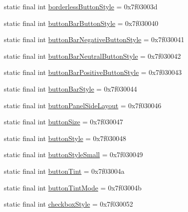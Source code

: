 \begin{DoxyCompactItemize}
\item 
static final int \mbox{\hyperlink{classcom_1_1google_1_1android_1_1gms_1_1R_1_1attr_a0ef109c40ff21ee8e450649d8db526da}{borderless\+Button\+Style}} = 0x7f03003d
\item 
static final int \mbox{\hyperlink{classcom_1_1google_1_1android_1_1gms_1_1R_1_1attr_a84d64f914b0bc986786ead1e107980df}{button\+Bar\+Button\+Style}} = 0x7f030040
\item 
static final int \mbox{\hyperlink{classcom_1_1google_1_1android_1_1gms_1_1R_1_1attr_a1795645e189a9bba9d8c2c4bb3d2d1dc}{button\+Bar\+Negative\+Button\+Style}} = 0x7f030041
\item 
static final int \mbox{\hyperlink{classcom_1_1google_1_1android_1_1gms_1_1R_1_1attr_a866757924e1d405e02f6cf270e912971}{button\+Bar\+Neutral\+Button\+Style}} = 0x7f030042
\item 
static final int \mbox{\hyperlink{classcom_1_1google_1_1android_1_1gms_1_1R_1_1attr_a3b34aebe94b7fdd791151198b441835e}{button\+Bar\+Positive\+Button\+Style}} = 0x7f030043
\item 
static final int \mbox{\hyperlink{classcom_1_1google_1_1android_1_1gms_1_1R_1_1attr_a7b876d2b8fb72861dece4acbb2daef79}{button\+Bar\+Style}} = 0x7f030044
\item 
static final int \mbox{\hyperlink{classcom_1_1google_1_1android_1_1gms_1_1R_1_1attr_ac38000d3b4bec362c023f0a03745f1f3}{button\+Panel\+Side\+Layout}} = 0x7f030046
\item 
static final int \mbox{\hyperlink{classcom_1_1google_1_1android_1_1gms_1_1R_1_1attr_a2b3c2b283dc7f0a0c71807b5aba1e48f}{button\+Size}} = 0x7f030047
\item 
static final int \mbox{\hyperlink{classcom_1_1google_1_1android_1_1gms_1_1R_1_1attr_a305792796eb10fbb54848e9de6aad5f0}{button\+Style}} = 0x7f030048
\item 
static final int \mbox{\hyperlink{classcom_1_1google_1_1android_1_1gms_1_1R_1_1attr_a3dadfd2e7626573578b25db00cfe076b}{button\+Style\+Small}} = 0x7f030049
\item 
static final int \mbox{\hyperlink{classcom_1_1google_1_1android_1_1gms_1_1R_1_1attr_a7bb1514ecd4380c071315af2ebf0fb3c}{button\+Tint}} = 0x7f03004a
\item 
static final int \mbox{\hyperlink{classcom_1_1google_1_1android_1_1gms_1_1R_1_1attr_a95d2271223834883f0f2993b70a05315}{button\+Tint\+Mode}} = 0x7f03004b
\item 
static final int \mbox{\hyperlink{classcom_1_1google_1_1android_1_1gms_1_1R_1_1attr_a9918ddfb15a0f5d95df3d0cd8ddcb15a}{checkbox\+Style}} = 0x7f030052

\end{DoxyCompactItemize}
